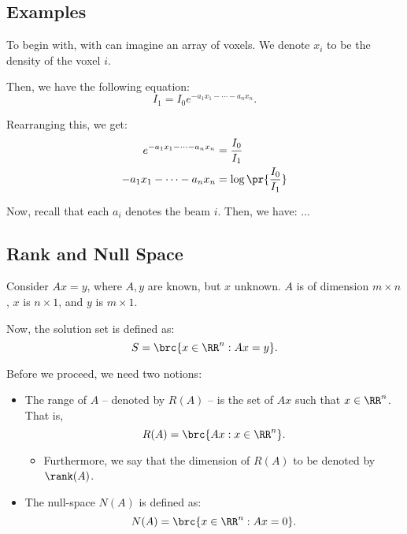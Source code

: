 \documentclass[openany]{book}
\begin{document}
\subsection{Examples}
\begin{example}
	To begin with, with can imagine an array of voxels. We denote $x_i$ to be the density of the voxel $i$.
	
	Then, we have the following equation:
	\begin{equation*}
		I_1 = I_0 e^{-a_1x_1 - \cdots - a_nx_n}.
	\end{equation*}
	
	Rearranging this, we get:
	\begin{align*}
		e^{-a_1x_1 - \cdots - a_nx_n} &= \frac{I_0}{I_1} \\
		-a_1x_1 - \cdots - a_nx_n &= \log\pr{\frac{I_0}{I_1}}
	\end{align*}
	
	Now, recall that each $a_i$ denotes the beam $i$. Then, we have: ...
\end{example}

\subsection{Rank and Null Space}
Consider $Ax = y$, where $A, y$ are known, but $x$ unknown. $A$ is of dimension $m \times n$, $x$ is $n \times 1$, and $y$ is $m \times 1$.

Now, the solution set is defined as:
\begin{equation*}
	S = \brc{x \in \RR^{n} : Ax = y}.
\end{equation*}

Before we proceed, we need two notions:
\begin{itemize}
	\item The range of $A$ -- denoted by $R(A)$ -- is the set of $Ax$ such that $x \in \RR^{n}$. That is,
	\begin{equation*}
		R(A) = \brc{Ax : x \in \RR^{n}}.
	\end{equation*}
	\begin{itemize}
		\item Furthermore, we say that the dimension of $R(A)$ to be denoted by $\rank (A)$.
	\end{itemize}
	\item The null-space $N(A)$ is defined as:
	\begin{equation*}
		N(A) = \brc{x \in \RR^{n} : Ax = 0}.
	\end{equation*}
\end{itemize}
\end{document}
